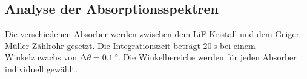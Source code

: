 \subsection{Analyse der Absorptionsspektren}
\label{subsec:absorptionsspektren}
Die verschiedenen Absorber werden zwischen dem LiF-Kristall und dem Geiger-Müller-Zählrohr gesetzt.
Die Integrationszeit beträgt $\SI{20}{\second}$ bei einem Winkelzuwachs von $\increment \theta = \SI{0.1}{\degree}$.
Die Winkelbereiche werden für jeden Absorber individuell gewählt.